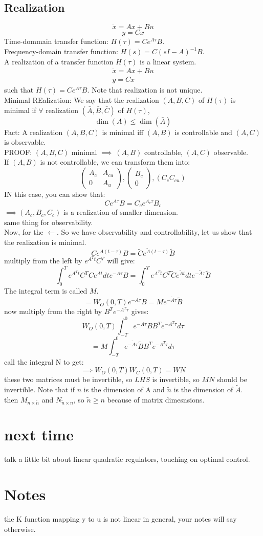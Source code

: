 \documentclass{article}
\begin{document}
\subsection{Realization}
\[\dot{x}=Ax+Bu\]
\[y=Cx\]
Time-dommain transfer function: $H(\tau)=Ce^{A\tau}B$.\\
Frequency-domain transfer function: $H(s)=C(sI-A)^{-1}B$.\\
A realization of a transfer function $H(\tau)$ is a linear system.
\[\begin{array}{c}\dot{x}=Ax+Bu\\y=Cx\end{array}\]
such that $H(\tau)=Ce^{A\tau}B$. Note that realization is not unique.\\
Minimal REalization: We say that the realization $(A,B,C)$ of $H(\tau)$ is minimal if $\forall$ realization $(\bar{A},\bar{B},\bar{C})$ of $H(\tau)$,\\
\[\dim(A)\leq \dim(\bar{A})\]
Fact: A realization $(A,B,C)$ is minimal iff $(A,B)$ is controllable and $(A,C)$ is observable.\\
PROOF: $(A,B,C)$ minimal $\implies\ (A,B)$ controllable, $(A,C)$ observable.\\
If $(A,B)$ is not controllable, we can transform them into:
\[\begin{pmatrix}A_c&A_{cu}\\0&A_u\end{pmatrix},\begin{pmatrix}B_c\\0\end{pmatrix},(C_c C_{cu})\]
IN this case, you can show that:
\[Ce^{A\tau}B=C_ce^{A_c\tau}B_c\]
$\implies (A_c,B_c,C_c)$ is a realization of smaller dimension.\\
same thing for observability.\\

Now, for the $\leftarrow$. So we have observability and controllability, let us show that the realization is minimal.\\
\[Ce^{A(t-\tau)}B=\tilde{C}e^{\tilde{A}(t-\tau)}\tilde{B}\]
multiply from the left by $e^{A^Tt}C^T$ will give:
\[\int_0^Te^{A^Tt}C^TCe^{At}dte^{-A\tau}B=\int_0^Te^{A^Tt}C^T\tilde{C}e^{\tilde{A}t}dte^{-\tilde{A}\tau}\tilde{B}\]
The integral term is called $M$.\\
\[=W_O(0,T)e^{-A\tau}B=Me^{-\tilde{A}\tau}\tilde{B}\]
now multiply from the right by $B^Te^{-A^T\tau}$ gives:
\[W_O(0,T)\int_{-T}^0e^{-A\tau}BB^Te^{-A^T\tau}d\tau\]
\[=M\int_{-T}^0e^{-\tilde{A}\tau}\tilde{B}B^Te^{-A^T\tau}d\tau\]
call the integral N to get:
\[\implies W_O(0,T)W_C(0,T)=WN\]
these two matrices must be invertible, so $LHS$ is invertible, so $MN$ should be invertible. Note that if $n$ is the dimension of A and $\tilde{n}$ is the dimension of $\tilde{A}$.\\
then $M_{n\times\tilde{n}}$ and $N_{\tilde{n}\times n}$, so $\tilde{n}\geq n$ because of matrix dimesnsions.\\

\section{next time}
talk a little bit about linear quadratic regulators, touching on optimal control.


\section{Notes}
the K function mapping y to u is not linear in general, your notes will say otherwise.\\
\end{document}
